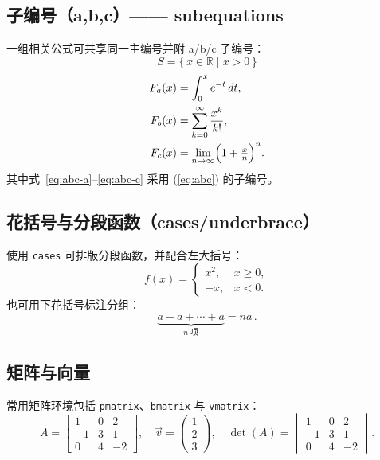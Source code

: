 \subsection{子编号（a,b,c）—— subequations}
一组相关公式可共享同一主编号并附 a/b/c 子编号：
\begin{equation}\label{eq:set}
  S = \{\, x \in \mathbb{R} \mid x>0 \,\}
\end{equation}
\begin{subequations}\label{eq:abc}
  \begin{align}
    F_a(x) &= \int_0^x e^{-t}\,dt, \label{eq:abc-a}\\
    F_b(x) &= \sum_{k=0}^{\infty} \frac{x^k}{k!}, \label{eq:abc-b}\\
    F_c(x) &= \lim_{n\to\infty} \Bigl(1+\tfrac{x}{n}\Bigr)^n. \label{eq:abc-c}
  \end{align}
\end{subequations}
其中式~\eqref{eq:abc-a}–\eqref{eq:abc-c} 采用 (\ref{eq:abc}) 的子编号。

\subsection{花括号与分段函数（cases/underbrace）}
使用 \verb|cases| 可排版分段函数，并配合左大括号：
\begin{equation}
  f(x) = \begin{cases}
    x^2, & x\ge 0,\\
    -x,  & x<0.
  \end{cases}
\end{equation}
也可用下花括号标注分组：
\begin{equation}
  \underbrace{a + a + \cdots + a}_{n\text{ 项}} = na\,.
\end{equation}

\subsection{矩阵与向量}
常用矩阵环境包括 \verb|pmatrix|、\verb|bmatrix| 与 \verb|vmatrix|：
\begin{equation}
  A = \begin{bmatrix}
    1 & 0 & 2 \\
    -1 & 3 & 1 \\
    0 & 4 & -2
  \end{bmatrix},\quad
  \vec{v} = \begin{pmatrix} 1 \\ 2 \\ 3 \end{pmatrix},\quad
  \det(A) = \begin{vmatrix}
    1 & 0 & 2 \\
    -1 & 3 & 1 \\
    0 & 4 & -2
  \end{vmatrix}.
\end{equation}

